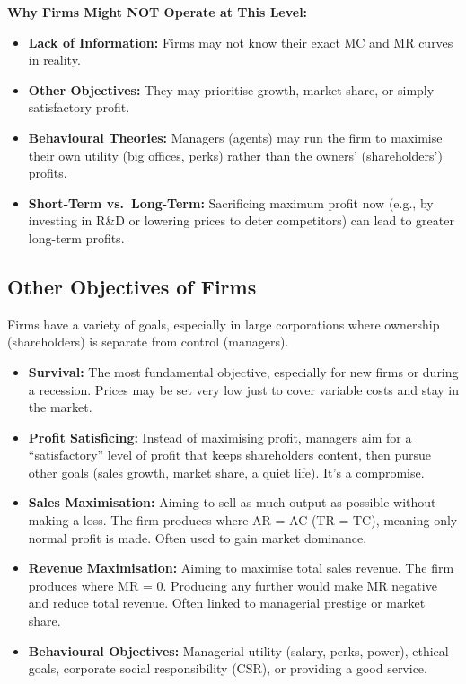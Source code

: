 \documentclass[11pt, a4paper, twoside]{book}
\begin{document}
\textbf{Why Firms Might NOT Operate at This Level:}
\begin{itemize}
  \item \textbf{Lack of Information:} Firms may not know their exact MC and MR curves in reality.
  \item \textbf{Other Objectives:} They may prioritise growth, market share, or simply satisfactory profit.
  \item \textbf{Behavioural Theories:} Managers (agents) may run the firm to maximise their own utility (big offices, perks) rather than the owners' (shareholders') profits.
  \item \textbf{Short-Term vs.\ Long-Term:} Sacrificing maximum profit now (e.g., by investing in R\&D or lowering prices to deter competitors) can lead to greater long-term profits.
\end{itemize}

\subsection{Other Objectives of Firms}

Firms have a variety of goals, especially in large corporations where ownership (shareholders) is separate from control (managers).

\begin{itemize}
  \item \textbf{Survival:} The most fundamental objective, especially for new firms or during a recession. Prices may be set very low just to cover variable costs and stay in the market.
  \item \textbf{Profit Satisficing:} Instead of maximising profit, managers aim for a ``satisfactory'' level of profit that keeps shareholders content, then pursue other goals (sales growth, market share, a quiet life). It's a compromise.
  \item \textbf{Sales Maximisation:} Aiming to sell as much output as possible without making a loss. The firm produces where AR = AC (TR = TC), meaning only normal profit is made. Often used to gain market dominance.
  \item \textbf{Revenue Maximisation:} Aiming to maximise total sales revenue. The firm produces where MR = 0. Producing any further would make MR negative and reduce total revenue. Often linked to managerial prestige or market share.
  \item \textbf{Behavioural Objectives:} Managerial utility (salary, perks, power), ethical goals, corporate social responsibility (CSR), or providing a good service.
\end{itemize}
\end{document}
